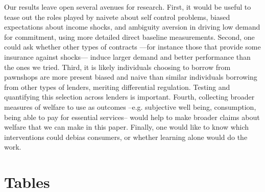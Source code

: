\documentclass[oneside,11pt]{article}
\begin{document}
Our results leave open several avenues for research. First, it would be useful to tease out the roles played by naivete about self control problems, biased expectations about income shocks, and ambiguity aversion in driving low demand for commitment, using more detailed direct baseline measurements. Second, one could ask whether other types of contracts ---for instance those that provide some insurance against shocks---  induce larger demand and better performance than the ones we tried. Third, it is likely individuals choosing to borrow from pawnshops are more present biased and naive than similar individuals borrowing from other types of lenders, meriting differential regulation. Testing and quantifying this selection across lenders is important.  Fourth, collecting broader measures of welfare to use as outcomes --e.g. subjective well being, consumption, being able to pay for essential services-- would help to make broader claims about welfare that we can make in this paper. Finally, one would like to know which interventions could debias consumers, or whether learning alone would do the work.







\newpage


\clearpage

%
%






\newpage
\singlespacing

\section{Tables}
\end{document}
